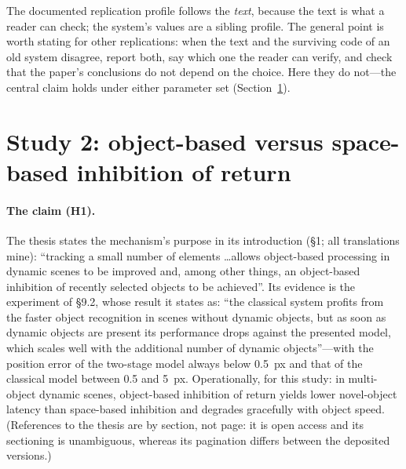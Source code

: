 \documentclass[11pt,a4paper]{article}
\begin{document}
The documented replication profile follows the \emph{text}, because the text is
what a reader can check; the system's values are a sibling profile. The general
point is worth stating for other replications: when the text and the surviving
code of an old system disagree, report both, say which one the reader can
verify, and check that the paper's conclusions do not depend on the choice.
Here they do not---the central claim holds under either parameter set
(Section~\ref{sec:h1}).

\section{Study 2: object-based versus space-based inhibition of return}
\label{sec:h1}

\paragraph{The claim (H1).} The thesis states the mechanism's purpose in its
introduction (\S1; all translations mine): ``tracking a small number of elements
\ldots allows object-based processing in dynamic scenes to be improved and,
among other things, an object-based inhibition of recently selected objects to be
achieved''. Its evidence is the experiment of \S9.2, whose result it states as:
``the classical system profits from the faster object recognition in scenes
without dynamic objects, but as soon as dynamic objects are present its
performance drops against the presented model, which scales well with the
additional number of dynamic objects''---with the position error of the
two-stage model always below 0.5~px and that of the classical model between 0.5
and 5~px. Operationally, for this study: in multi-object dynamic scenes,
object-based inhibition of return yields lower novel-object latency than
space-based inhibition and degrades gracefully with object speed. (References to
the thesis are by section, not page: it is open access and its sectioning is
unambiguous, whereas its pagination differs between the deposited versions.)
\end{document}
